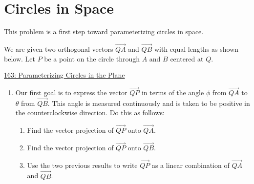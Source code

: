\documentclass{ximera}
\begin{document}
\section{Circles in Space}

\begin{question}  \label{Qdfds45rt54rr3tg}
This problem is a first step toward parameterizing circles in space. 

We are given two orthogonal vectors $\overrightarrow{QA}$ and $\overrightarrow{QB}$ with equal lengths as shown below. Let $P$ be a point on the circle through $A$ and $B$ centered at $Q$. 

\begin{onlineOnly}
    \begin{center}
\end{center}
\end{onlineOnly}

\href{https://www.desmos.com/calculator/arrfrcusn5}{163: Parameterizing Circles in the Plane}

\begin{enumerate}
\item{Our first goal is to express the vector $\overrightarrow{QP}$ in terms of the angle $\phi$ from $\overrightarrow{QA}$ to  $\theta$ from $\overrightarrow{QB}$. This angle is measured continuously and is taken to be positive in the counterclockwise direction. Do this as follows:}

\begin{enumerate}
\item{Find the vector projection of $\overrightarrow{QP}$ onto $\overrightarrow{QA}$.
\begin{multipleChoice}
\end{multipleChoice}
}
 \item{Find the vector projection of $\overrightarrow{QP}$ onto $\overrightarrow{QB}$.
\begin{multipleChoice}
\end{multipleChoice}
}

\item{Use the two previous results to write $\overrightarrow{QP}$ as a linear combination of  $\overrightarrow{QA}$ and $\overrightarrow{QB}$.
\begin{multipleChoice}
\end{multipleChoice}
}


\end{enumerate}
\end{enumerate}
\end{question}
\end{document}
